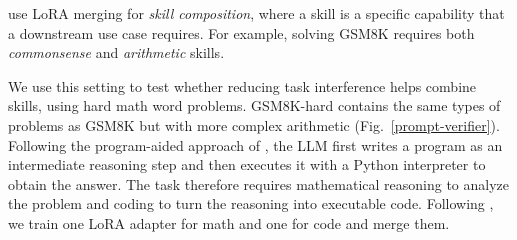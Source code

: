 \documentclass[10pt]{article} %
\begin{document}
    \citet{prabhakar2025lora} use LoRA merging for \textit{skill
    composition}, where a skill is a specific capability that a downstream use
    case requires. For example, solving GSM8K \citep{cobbe2021training} requires
    both \textit{commonsense} and \textit{arithmetic} skills.

    We use this setting to test whether reducing task interference helps
    combine skills, using hard math word problems.
    GSM8K-hard \citep{gao2023pal} contains the same types of problems as GSM8K
    \citep{cobbe2021training} but with more complex arithmetic (Fig.~\ref{prompt-verifier}).
    Following the program-aided approach of \citet{gao2023pal}, the LLM first
    writes a program as an intermediate reasoning step and then executes it with
    a Python interpreter to obtain the answer. The task therefore requires
    mathematical reasoning to analyze the problem and coding to turn the
    reasoning into executable code. Following \citet{prabhakar2025lora}, we
    train one LoRA adapter for math and one for code and merge them.
\end{document}
